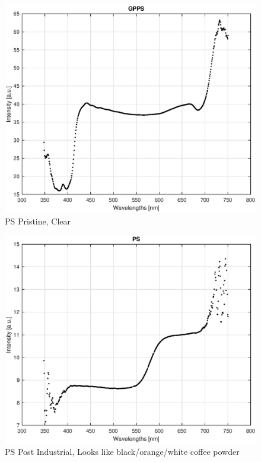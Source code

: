 \begin{appendices}
\begin{figure}
    \centering
    \includegraphics[width = 12cm]{Images/appendix/ps-pristine-clear.eps}
    \caption[$\; \:$PS Pristine]{PS Pristine, Clear}
    \label{fig:ps-clear}
\end{figure}

\begin{figure}
    \centering
    \includegraphics[width = 12cm]{Images/appendix/ps-postindust.eps}
    \caption[$\; \:$PS Post Industrial]{PS Post Industrial, Looks like black/orange/white coffee powder}
    \label{fig:ps-coffee}
\end{figure}


\end{appendices}
